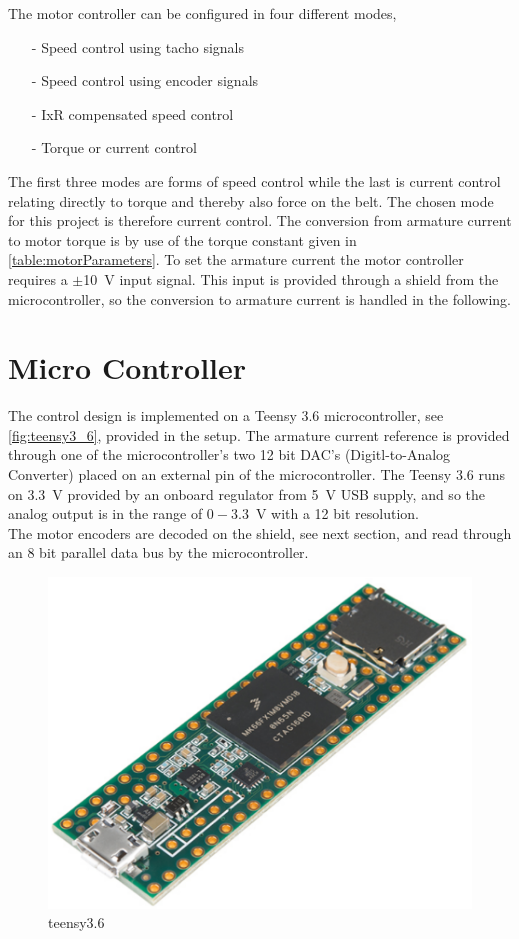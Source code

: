 The motor controller can be configured in four different modes,
\vspace{-10pt}
\begin{itemize}
  \item[-] Speed control using tacho signals
  \item[-] Speed control using encoder signals
  \item[-] IxR compensated speed control
  \item[-] Torque or current control
\end{itemize}
\vspace{-10pt}
The first three modes are forms of speed control while the last is current control relating directly to torque and thereby also force on the belt. The chosen mode for this project is therefore current control. The conversion from armature current to motor torque is by use of the torque constant given in \autoref{table:motorParameters}. To set the armature current the motor controller requires a $\pm$\SI{10}{V} input signal. This input is provided through a shield from the microcontroller, so the conversion to armature current is handled in the following.

\section{Micro Controller}
The control design is implemented on a Teensy 3.6 microcontroller, see \autoref{fig:teensy3_6}, provided in the setup. The armature current reference is provided through one of the microcontroller's two 12 bit DAC's (Digitl-to-Analog Converter) placed on an external pin of the microcontroller. The Teensy 3.6 runs on \SI{3.3}{V} provided by an onboard regulator from \SI{5}{V} USB supply, and so the analog output is in the range of $0-$\SI{3.3}{V} with a 12 bit resolution.\\
The motor encoders are decoded on the shield, see next section, and read through an 8 bit parallel data bus by the microcontroller.


\begin{figure}[H]
  \includegraphics[width=.2\textwidth]{figures/teensy3_6}
  \caption{teensy3.6}
  \label{fig:teensy3_6}
\end{figure}

